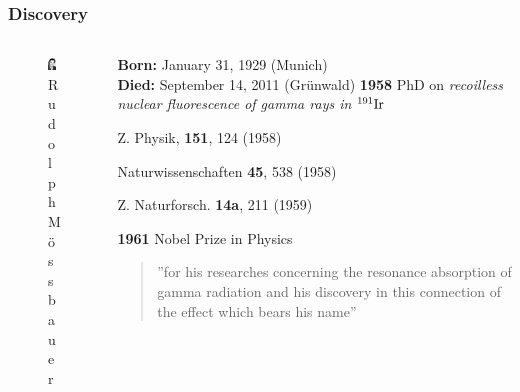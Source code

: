 	\begin{frame}
		\frametitle{Discovery}
		\begin{columns}
			\begin{column}{0.38\linewidth}
				\begin{figure}
					\centering
					\includegraphics[width=3.5cm]{images/moessbauer-portrait.jpg}
					\caption{Rudolph Mössbauer}
				\end{figure}
			\end{column}
			\begin{column}{0.58\linewidth}
				\textbf{Born:} January 31, 1929 (Munich) \\
				\textbf{Died:} September 14, 2011 (Grünwald)\vspace{\baselineskip}
				\textbf{1958} PhD on \textit{recoilless nuclear fluorescence of gamma rays in $^{191}\ce{Ir}$}
				\fontsize{9pt}{11pt}
				\begin{em}
					\flushright
					Z. Physik, \textbf{151}, 124 (1958)
					
					Naturwissenschaften \textbf{45}, 538 (1958)
					
					Z. Naturforsch. \textbf{14a}, 211 (1959)
					
				\end{em}
				\par
				\textbf{1961} Nobel Prize in Physics
				\fontsize{8pt}{9pt}
				\begin{quotation}
					\flushright
					''for his researches concerning the resonance absorption of gamma radiation and his discovery in this connection of the effect which bears his name''
				\end{quotation}
			\end{column}
		\end{columns}
	\end{frame}
		
